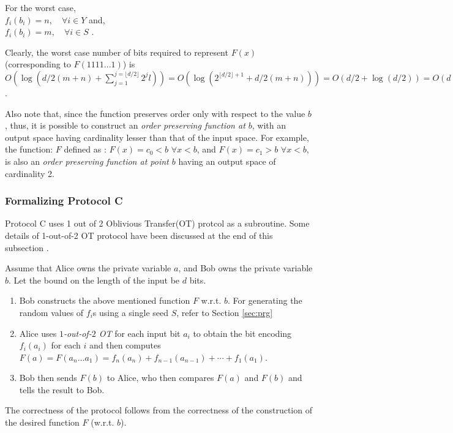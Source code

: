 \documentclass[11pt, letterpaper, romanappendices, onecolumn]{article}
\theoremstyle{plain}\newtheorem{thm}{Theorem}[section]
\theoremstyle{definition}
\theoremstyle{remark}
\begin{document}
\par For the worst case, \\
$f_i(b_i) = n, \quad \forall i \in Y$ and, \\
$f_i(b_i) = m, \quad \forall i \in S$ .

\par Clearly, the worst case number of bits required to represent $F(x)$ (corresponding to $F(1111...1)$) is $O(\log (d/2(m+n)+ \sum\limits_{j=1}^{j= \lfloor d/2 \rfloor} 2^j l)) = O(\log (2^{\lfloor d/2\rfloor+1} + d/2(m+n))) = O(d/2+\log (d/2)) = O(d)$. \par Also note that, since the function preserves order only with respect to the value $b$, thus, it is possible to construct an \textit{order preserving function at $b$}, with an output space having cardinality lesser than that of the input space. For example, the function: $F$ defined as : $F(x)=c_0<b$ $\forall x<b$, and $F(x)=c_1>b$ $\forall x<b$, is also an \textit{order preserving function at point $b$} having an output space of cardinality 2. 

\subsubsection{Formalizing Protocol \textsf{C}}
Protocol \textsf{C} uses 1 out of 2 Oblivious Transfer(OT) protcol as a subroutine. Some details of 1-out-of-2 OT protocol \citet{rabin2005exchange} have been discussed at the end of this subsection . 
\par Assume that Alice owns the private variable $a$, and Bob owns the private variable $b$. Let the bound on the length of the input be $d$ bits.
\begin{enumerate}
	\item Bob constructs the above mentioned function $F$ w.r.t. $b$. For generating the random values of $f_i$s using a single seed $S$, refer to Section \ref{sec:prg}
	\item Alice uses \textit{$1$-out-of-$2$ OT} for each input bit $a_i$ to obtain the bit encoding $f_i (a_i)$ for each $i$ and then computes $F(a) = F(a_n\ldots a_1)=f_n (a_n) + f_{n-1} (a_{n-1}) + \cdots + f_1(a_1)$.
	\item Bob then sends $F(b)$ to Alice, who then compares $F(a)$ and $F(b)$ and tells the result to Bob.
\end{enumerate}

\par The correctness of the protocol follows from the correctness of the construction of the desired function $F$ (w.r.t. $b$).
\end{document}
